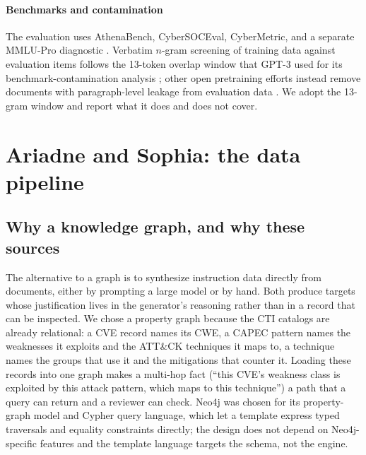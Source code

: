 \documentclass[twocolumn]{svjour3}
\begin{document}
\paragraph{Benchmarks and contamination}
The evaluation uses AthenaBench, CyberSOCEval, CyberMetric, and a separate MMLU-Pro diagnostic \cite{alam2025athenabench,deason2025cybersoceval,tihanyi2024cybermetric,wang2024mmlupro}. Verbatim $n$-gram screening of training data against evaluation items follows the 13-token overlap window that GPT-3 used for its benchmark-contamination analysis \cite{brown2020gpt3}; other open pretraining efforts instead remove documents with paragraph-level leakage from evaluation data \cite{groeneveld2024olmo}. We adopt the 13-gram window and report what it does and does not cover.

\section{Ariadne and Sophia: the data pipeline}\label{sec:data}
\subsection{Why a knowledge graph, and why these sources}
The alternative to a graph is to synthesize instruction data directly from documents, either by prompting a large model or by hand. Both produce targets whose justification lives in the generator's reasoning rather than in a record that can be inspected. We chose a property graph because the CTI catalogs are already relational: a CVE record names its CWE, a CAPEC pattern names the weaknesses it exploits and the ATT\&CK techniques it maps to, a technique names the groups that use it and the mitigations that counter it. Loading these records into one graph makes a multi-hop fact (``this CVE's weakness class is exploited by this attack pattern, which maps to this technique'') a path that a query can return and a reviewer can check. Neo4j was chosen for its property-graph model and Cypher query language, which let a template express typed traversals and equality constraints directly; the design does not depend on Neo4j-specific features and the template language targets the schema, not the engine.
\end{document}

